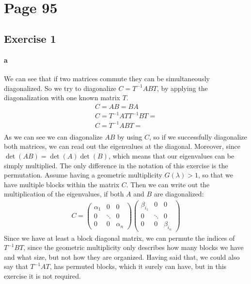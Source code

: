 \section{Page 95}
\subsection{Exercise 1}
\paragraph{a}
We can see that if two matrices commute they can be simultaneously diagonalized.
So we try to diagonalize $C = T^{-1}AB T$, by applying the diagonalization with one known matrix $T$.
\begin{gather*}
C = AB =BA\\
C = T^{-1} A T T^{-1} B T =\\
C = T^{-1} A B T = \\
\end{gather*}
As we can see we can diagonalize $AB$ by using $C$, so if we successfully diagonalize both matrices, we can read out the eigenvalues at the diagonal. Moreover, since $\det(AB) = \det(A) \det(B)$, which means that our eigenvalues can be simply multiplied. The only difference in the notation of this exercise is the permutation. 
Assume having a geometric multiplicity $ G(\lambda) > 1$, so that we have multiple blocks within the matrix $C$.
Then we can write out the multiplication of the eigenvalues, if both $A$ and $B$ are diagonalized:
\begin{gather*}
C =
\left( \begin{array}{ccc}
\alpha_1 & 0 & 0 \\
0 & \ddots & 0\\
0 & 0 & \alpha_n 
\end{array} \right)
\left( \begin{array}{ccc}
\beta_{i_1} & 0 & 0\\
0 & \ddots & 0\\
0 & 0 & \beta_{i_n}
\end{array} \right)
\end{gather*}
Since we have at least a block diagonal matrix, we can permute the indices of $  T^{-1} B T $, since the geometric multiplicity only describes how many blocks we have and what size, but not how they are organized. 
Having said that, we could also say that $ T^{-1} A T $, has permuted blocks, which it surely can have, but in this exercise it is not required.

